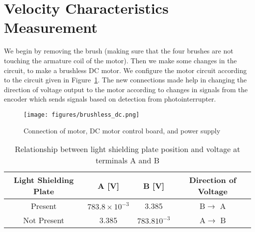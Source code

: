 \documentclass[12pt,a4paper]{report}
\begin{document}
\section{Velocity Characteristics Measurement}
We begin by removing the brush (making sure that the four brushes are not touching the armature coil of the motor). 
Then we make some changes in the circuit, to make a brushless DC motor. We configure the motor circuit according to the circuit given in 
Figure~\ref{fig:brushless_dc}. 
The new connections made help in changing the direction of voltage output to the motor according to changes in signals from the encoder which sends 
signals based on detection from photointerrupter.
\begin{figure}[ht]
	\texttt{[image: figures/brushless\_dc.png]}
	\caption{Connection of motor, DC motor control board, and power supply}
	\label{fig:brushless_dc}
\end{figure}

\begin{table}[ht]
	\centering
	\caption{Relationship between light shielding plate position and voltage at terminals A and B}
	\label{tab:light_shield}
	\begin{tabular}{|c|c|c|c|}
		\hline
		{Light Shielding Plate} & A [V] & B [V] & Direction of Voltage\\
		\hline
		Present & \({783.8\times 10^{-3}}\) & 3.385 & B$\rightarrow$ A \\
		\hline
		Not Present & 3.385 & ${783.8 10^{-3}}$ & A$\rightarrow$ B\\
		\hline
	\end{tabular}
\end{table}
\end{document}
